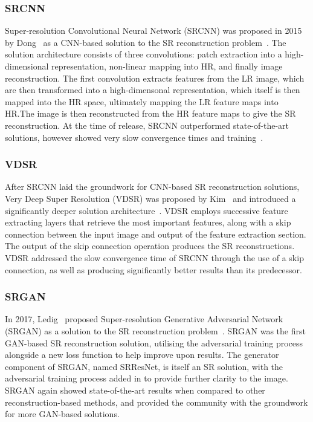 \subsubsection{SRCNN}
Super-resolution Convolutional Neural Network (SRCNN) was proposed in 2015 by Dong \etal\ as a CNN-based solution to the SR reconstruction problem~\cite{srcnn}. The solution architecture consists of three convolutions: patch extraction into a high-dimensional representation, non-linear mapping into HR, and finally image reconstruction. The first convolution extracts features from the LR image, which are then transformed into a high-dimensonal representation, which itself is then mapped into the HR space, ultimately mapping the LR feature maps into HR.\@ The image is then reconstructed from the HR feature maps to give the SR reconstruction. At the time of release, SRCNN outperformed state-of-the-art solutions, however showed very slow convergence times and training~\cite{srcnn}.

\subsubsection{VDSR}
After SRCNN laid the groundwork for CNN-based SR reconstruction solutions, Very Deep Super Resolution (VDSR) was proposed by Kim \etal\ and introduced a significantly deeper solution architecture~\cite{vdsr}. VDSR employs successive feature extracting layers that retrieve the most important features, along with a skip connection between the input image and output of the feature extraction section. The output of the skip connection operation produces the SR reconstructions. VDSR addressed the slow convergence time of SRCNN through the use of a skip connection, as well as producing significantly better results than its predecessor.

\subsubsection{SRGAN}
In 2017, Ledig \etal\ proposed Super-resolution Generative Adversarial Network (SRGAN) as a solution to the SR reconstruction problem~\cite{srgan}. SRGAN was the first GAN-based SR reconstruction solution, utilising the adversarial training process alongside a new loss function to help improve upon results. The generator component of SRGAN, named SRResNet, is itself an SR solution, with the adversarial training process added in to provide further clarity to the image. SRGAN again showed state-of-the-art results when compared to other reconstruction-based methods, and provided the community with the groundwork for more GAN-based solutions.

